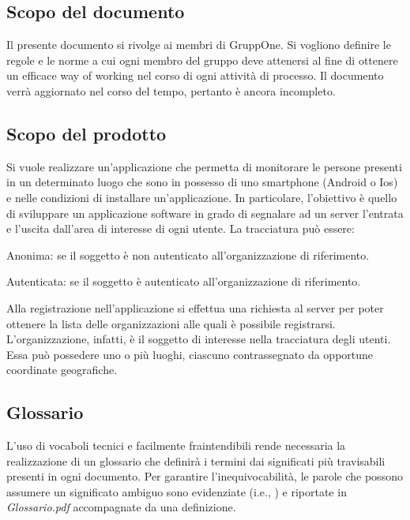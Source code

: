 \documentclass[../norme-di-progetto.tex]{subfiles}
\begin{document}
\subsection{Scopo del documento}%
\label{sub:scopo_del_documento}

Il presente documento si rivolge ai membri di GruppOne.
Si vogliono definire le regole e le norme a cui ogni membro del gruppo deve attenersi al fine di ottenere un efficace way of working nel corso di ogni attività di processo.
Il documento verrà aggiornato nel corso del tempo, pertanto è ancora incompleto.

\subsection{Scopo del prodotto}%
\label{sub:scopo_del_prodotto}

Si vuole realizzare un'applicazione che permetta di monitorare le persone presenti in un determinato luogo che sono in possesso di uno smartphone (Android o Ios) e nelle condizioni di installare un'applicazione.
In particolare, l'obiettivo è quello di sviluppare un applicazione software in grado di segnalare ad un server l'entrata e l'uscita dall'area di interesse di ogni utente. La tracciatura può essere:
\begin{description}
  \item Anonima: se il soggetto è non autenticato all'organizzazione di riferimento.
  \item Autenticata: se il soggetto è autenticato all'organizzazione di riferimento.
\end{description}
Alla registrazione nell'applicazione si effettua una richiesta al server per poter ottenere la lista delle organizzazioni alle quali è possibile registrarsi. L'organizzazione, infatti, è il soggetto di interesse nella tracciatura degli utenti. Essa può possedere uno o più luoghi, ciascuno contrassegnato da opportune coordinate geografiche.

\subsection{Glossario}%
\label{sub:glossario}

L'uso di vocaboli tecnici e facilmente fraintendibili rende necessaria la realizzazione di un glossario che definirà i termini dai significati più travisabili presenti in ogni documento.
Per garantire l'inequivocabilità, le parole che possono assumere un significato ambiguo sono evidenziate (i.e., ) e riportate in \textit{Glossario.pdf} accompagnate da una definizione.
\end{document}
